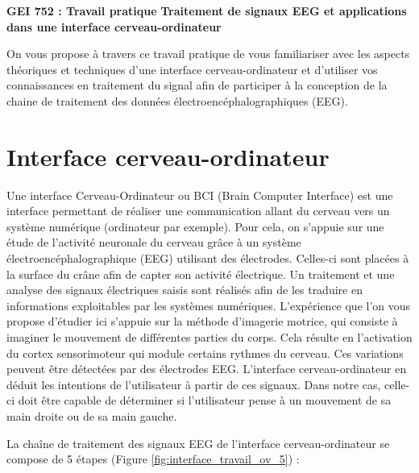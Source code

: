 \newpage
\thispagestyle{fancy}

\begin{center}
	\huge\textbf{GEI 752 : Travail pratique}
	\bigbreak
	\LARGE\textbf{Traitement de signaux EEG et applications dans une interface cerveau-ordinateur}
	\bigbreak
\end{center}

\normalsize

On vous propose à travers ce travail pratique de vous familiariser avec les aspects théoriques et techniques d'une interface cerveau-ordinateur et d'utiliser vos connaissances en traitement du signal afin de participer à la conception de la chaine de traitement des données électroencéphalographiques (EEG).

\newpage
\section*{Interface cerveau-ordinateur}

Une interface Cerveau-Ordinateur ou BCI (Brain Computer Interface) est une interface permettant de réaliser une communication allant du cerveau vers un système numérique (ordinateur par exemple). Pour cela, on s'appuie sur une étude de l'activité neuronale du cerveau grâce à un système électroencéphalographique (EEG) utilisant des électrodes. Celles-ci sont placées à la surface du crâne afin de capter son activité électrique. Un traitement et une analyse des signaux électriques saisis sont réalisés afin de les traduire en informations exploitables par les systèmes numériques. L'expérience que l'on vous propose d'étudier ici s'appuie sur la méthode d'imagerie motrice, qui consiste à imaginer le mouvement de différentes parties du corps. Cela résulte en l'activation du cortex sensorimoteur qui module certains rythmes du cerveau. Ces variations peuvent être détectées par des électrodes EEG. L'interface cerveau-ordinateur en déduit les intentions de l'utilisateur à partir de ces signaux. Dans notre cas, celle-ci doit être capable de déterminer si l'utilisateur pense à un mouvement de sa main droite ou de sa main gauche.

La chaîne de traitement des signaux EEG de l'interface cerveau-ordinateur se compose de 5 étapes (Figure	\ref{fig:interface_travail_ov_5}) : 

